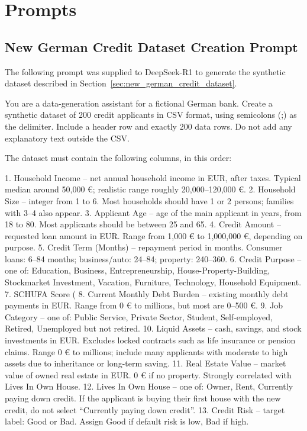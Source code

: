 \chapter{Prompts}
\label{app:prompts}
\section*{New German Credit Dataset Creation Prompt}
The following prompt was supplied to DeepSeek-R1 to generate the synthetic dataset described in Section~\ref{sec:new_german_credit_dataset}.
\begin{promptbox}[label={prompt:new_german_credit_generation},listing options={basicstyle=\ttfamily\small,columns=fullflexible,keepspaces=true,showstringspaces=false,breaklines=true,breakatwhitespace=true,breakindent=0pt,upquote=true,inputencoding=utf8,literate={–}{{--}}1 {€}{{\texteuro}}1 {→}{{$\rightarrow$}}1 {“}{{``}}1 {”}{{''}}1}]
You are a data-generation assistant for a fictional German bank. Create a synthetic dataset of 200 credit applicants in CSV format, using semicolons (;) as the delimiter. Include a header row and exactly 200 data rows. Do not add any explanatory text outside the CSV.

The dataset must contain the following columns, in this order:

1. Household Income – net annual household income in EUR, after taxes. Typical median around 50,000 €; realistic range roughly 20,000–120,000 €.
2. Household Size – integer from 1 to 6. Most households should have 1 or 2 persons; families with 3–4 also appear.
3. Applicant Age – age of the main applicant in years, from 18 to 80. Most applicants should be between 25 and 65.
4. Credit Amount – requested loan amount in EUR. Range from 1,000 € to 1,000,000 €, depending on purpose.
5. Credit Term (Months) – repayment period in months. Consumer loans: 6–84 months; business/auto: 24–84; property: 240–360.
6. Credit Purpose – one of: Education, Business, Entrepreneurship, House-Property-Building, Stockmarket Investment, Vacation, Furniture, Technology, Household Equipment.
7. SCHUFA Score (%
8. Current Monthly Debt Burden – existing monthly debt payments in EUR. Range from 0 € to millions, but most are 0–500 €.
9. Job Category – one of: Public Service, Private Sector, Student, Self-employed, Retired, Unemployed but not retired.
10. Liquid Assets – cash, savings, and stock investments in EUR. Excludes locked contracts such as life insurance or pension claims. Range 0 € to millions; include many applicants with moderate to high assets due to inheritance or long-term saving.
11. Real Estate Value – market value of owned real estate in EUR. 0 € if no property. Strongly correlated with Lives In Own House.
12. Lives In Own House – one of: Owner, Rent, Currently paying down credit. If the applicant is buying their first house with the new credit, do not select “Currently paying down credit”.
13. Credit Risk – target label: Good or Bad. Assign Good if default risk is low, Bad if high.


\end{promptbox}
